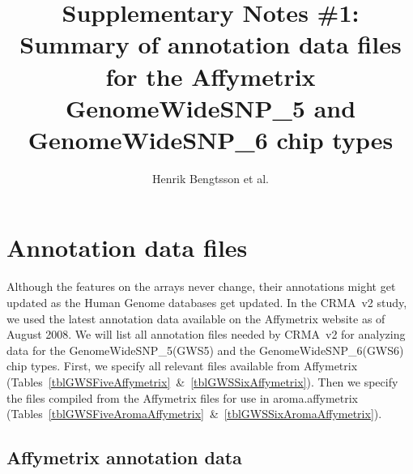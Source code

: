 \documentclass[10pt,a4paper]{article}
\newcommand{\GWSFivef}{GenomeWideSNP\_5\xspace}
\newcommand{\GWSSixf}{GenomeWideSNP\_6\xspace}
\begin{document}
\title{Supplementary Notes \#1:\\Summary of annotation data files for the Affymetrix GenomeWideSNP\_5 and GenomeWideSNP\_6 chip types}
\author{Henrik Bengtsson et al.}
\maketitle
\tableofcontents

\clearpage
\section{Annotation data files}
Although the features on the arrays never change, their annotations might get updated as the Human Genome databases get updated.  In the CRMA~v2 study, we used the latest annotation data available on the Affymetrix website as of August 2008.
We will list all annotation files needed by CRMA~v2 for analyzing data for the \GWSFivef (GWS5) and the \GWSSixf (GWS6) chip types.  First, we specify all relevant files available from Affymetrix (Tables~\ref{tblGWSFiveAffymetrix}~\&~\ref{tblGWSSixAffymetrix}).  Then we specify the files compiled from the Affymetrix files for use in aroma.affymetrix (Tables~\ref{tblGWSFiveAromaAffymetrix}~\&~\ref{tblGWSSixAromaAffymetrix}).

\subsection{Affymetrix annotation data}
\end{document}
